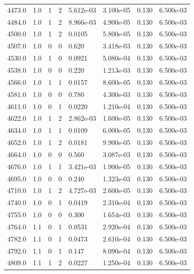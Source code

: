 \documentclass[preview]{standalone}
\begin{document}
{{{{{{{{{\begin{tabular}{L{1.2cm}C{1.2cm} C{0.3cm}C{0.5cm} C{1.4cm}C{1.4cm} C{1.4cm}C{1.4cm}}
  4473.0  &   1.0  & 1     &  2 &  5.612e-03  & 3.100e-05  & 0.130 &  6.500e-03   \\ 
  4484.0  &   1.0  & 1     &  2 &  8.966e-03  & 4.900e-05  & 0.130 &  6.500e-03   \\ 
  4500.0  &   1.0  & 1     &  2 &  0.0105  & 5.800e-05  & 0.130 &  6.500e-03   \\ 
  4507.0  &   1.0  & 0     &  0 &  0.620  & 3.418e-03  & 0.130 &  6.500e-03   \\ 
  4530.0  &   1.0  & 1     &  0 &  0.0921  & 5.080e-04  & 0.130 &  6.500e-03   \\ 
  4538.0  &   1.0  & 0     &  0 &  0.220  & 1.213e-03  & 0.130 &  6.500e-03   \\ 
  4566.0  &   1.0  & 1     &  1 &  0.0157  & 8.600e-05  & 0.130 &  6.500e-03   \\ 
  4581.0  &   1.0  & 0     &  0 &  0.780  & 4.300e-03  & 0.130 &  6.500e-03   \\ 
  4611.0  &   1.0  & 0     &  1 &  0.0220  & 1.210e-04  & 0.130 &  6.500e-03   \\ 
  4622.0  &   1.0  & 1     &  2 &  2.862e-03  & 1.600e-05  & 0.130 &  6.500e-03   \\ 
  4634.0  &   1.0  & 1     &  1 &  0.0109  & 6.000e-05  & 0.130 &  6.500e-03   \\ 
  4652.0  &   1.0  & 1     &  2 &  0.0181  & 9.900e-05  & 0.130 &  6.500e-03   \\ 
  4664.0  &   1.0  & 0     &  0 &  0.560  & 3.087e-03  & 0.130 &  6.500e-03   \\ 
  4676.0  &   1.0  & 1     &  1 &  3.421e-03  & 1.900e-05  & 0.130 &  6.500e-03   \\ 
  4695.0  &   1.0  & 0     &  0 &  0.240  & 1.323e-03  & 0.130 &  6.500e-03   \\ 
  4710.0  &   1.0  & 1     &  2 &  4.727e-03  & 2.600e-05  & 0.130 &  6.500e-03   \\ 
  4740.0  &   1.0  & 0     &  1 &  0.0419  & 2.310e-04  & 0.130 &  6.500e-03   \\ 
  4755.0  &   1.0  & 0     &  0 &  0.300  & 1.654e-03  & 0.130 &  6.500e-03   \\ 
  4764.0  &   1.1  & 0     &  1 &  0.0531  & 2.920e-04  & 0.130 &  6.500e-03   \\ 
  4782.0  &   1.1  & 0     &  1 &  0.0473  & 2.610e-04  & 0.130 &  6.500e-03   \\ 
  4792.0  &   1.1  & 0     &  1 &  0.147  & 8.090e-04  & 0.130 &  6.500e-03   \\ 
  4809.0  &   1.1  & 1     &  2 &  0.0227  & 1.250e-04  & 0.130 &  6.500e-03   \\ 

\end{tabular}}}}}}}}}}
\end{document}
